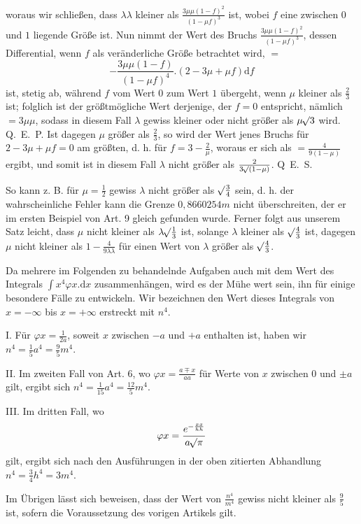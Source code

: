 woraus wir schließen, dass \(\lambda\lambda\) kleiner als \(\frac{3\mu\mu(1-f)^2}{(1-\mu f)^3}\) ist, wobei \(f\) eine zwischen \(0\) und \(1\) liegende Größe ist. Nun nimmt der Wert des Bruchs \(\frac{3\mu\mu(1-f)^2}{(1-\mu f)^3}\), dessen Differential, wenn \(f\) als veränderliche Größe betrachtet wird, \(=\)
\[
-\frac{3\mu\mu(1-f)}{(1-\mu f)^4}.(2-3\mu+\mu f)\mathrm{d}f
\]
ist, stetig ab, während \(f\) vom Wert \(0\) zum Wert \(1\) übergeht, wenn \(\mu\) kleiner als \(\tfrac23\) ist; folglich ist der größtmögliche Wert derjenige, der \(f=0\) entspricht, nämlich \(=3\mu\mu\), sodass in diesem Fall \(\lambda\) gewiss kleiner oder nicht größer als \(\mu\mathord{{}^{}\!\surd}3\) wird. Q.~E.~P. Ist dagegen \(\mu\) größer als \(\tfrac23\), so wird der Wert jenes Bruchs für \(2-3\mu+\mu f=0\) am größten, d. h. für \(f=3-\tfrac2\mu\), woraus er sich als \(=\frac4{9(1-\mu)}\) ergibt, und somit ist in diesem Fall \(\lambda\) nicht größer als \(\frac2{3\mathord{{}^{}\!\surd}(1-\mu)}\). Q~E.~S.

So kann z. B. für \(\mu=\tfrac12\) gewiss \(\lambda\) nicht größer als \(\mathord{{}^{}\!\surd}\tfrac34\) sein, d. h. der wahrscheinliche Fehler kann die Grenze \(0{,}8660254m\) nicht überschreiten, der er im ersten Beispiel von Art. 9 gleich gefunden wurde. Ferner folgt aus unserem Satz leicht, dass \(\mu\) nicht kleiner als \(\lambda\mathord{{}^{}\!\surd}\tfrac13\) ist, solange \(\lambda\) kleiner als \(\mathord{{}^{}\!\surd}\tfrac43\) ist, dagegen \(\mu\) nicht kleiner als \(1-\frac4{9\lambda\lambda}\) für einen Wert von \(\lambda\) größer als \(\mathord{{}^{}\!\surd}\tfrac43\).

Da mehrere im Folgenden zu behandelnde Aufgaben auch mit dem Wert des Integrals \(\int x^4\varphi x.\mathrm{d}x\) zusammenhängen, wird es der Mühe wert sein, ihn für einige besondere Fälle zu entwickeln. Wir bezeichnen den Wert dieses Integrals von \(x=-\infty\) bis \(x=+\infty\) erstreckt mit \(n^4\).

I. Für \(\varphi x=\tfrac1{2a}\), soweit \(x\) zwischen \(-a\) und \(+a\) enthalten ist, haben wir \(n^4=\tfrac15a^4=\tfrac95m^4\).

II. Im zweiten Fall von Art. 6, wo \(\varphi x=\frac{a\mp x}{aa}\) für Werte von \(x\) zwischen \(0\) und \(\pm a\) gilt, ergibt sich \(n^4=\tfrac1{15}a^4=\tfrac{12}{5}m^4\).

III. Im dritten Fall, wo
\[
\varphi x=\frac{e^{-\frac{xx}{hh}}}{a\mathord{{}^{}\!\surd}\pi}
\]
gilt, ergibt sich nach den Ausführungen in der oben zitierten Abhandlung \(n^4=\tfrac34h^4=3m^4\).

Im Übrigen lässt sich beweisen, dass der Wert von \(\frac{n^4}{m^4}\) gewiss nicht kleiner als \(\tfrac95\) ist, sofern die Voraussetzung des vorigen Artikels gilt.

\clearpage
